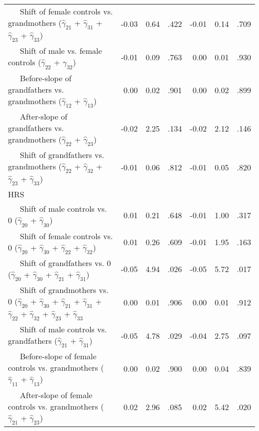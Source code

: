 \documentclass[
  english,
  man, noextraspace]{apa7}
\newenvironment{lltable}{\begin{landscape}\begin{center}\begin{ThreePartTable}}{\end{ThreePartTable}\end{center}\end{landscape}}
\begin{document}
\begin{appendix}
\begin{lltable}
{\begin{longtable}{lrrrrrr}
\ \ \ Shift of female controls vs. grandmothers 
($\hat{\gamma}_{21}$ + $\hat{\gamma}_{31}$ + 
$\hat{\gamma}_{23}$ + $\hat{\gamma}_{33}$) \textcolor{white}{L} & -0.03 & 0.64 & .422 & -0.01 & 0.14 & .709\\
\ \ \ Shift of male vs. female controls 
($\hat{\gamma}_{22}$ + $\hat{\gamma}_{32}$) \textcolor{white}{L} & -0.01 & 0.09 & .763 & 0.00 & 0.01 & .930\\
\ \ \ Before-slope of grandfathers vs. grandmothers 
($\hat{\gamma}_{12}$ + $\hat{\gamma}_{13}$) \textcolor{white}{L} & 0.00 & 0.02 & .901 & 0.00 & 0.02 & .899\\
\ \ \ After-slope of grandfathers vs. grandmothers 
($\hat{\gamma}_{22}$ + $\hat{\gamma}_{23}$) \textcolor{white}{L} & -0.02 & 2.25 & .134 & -0.02 & 2.12 & .146\\
\ \ \ Shift of grandfathers vs. grandmothers 
($\hat{\gamma}_{22}$ + $\hat{\gamma}_{32}$ + 
$\hat{\gamma}_{23}$ + $\hat{\gamma}_{33}$) \textcolor{white}{L} & -0.01 & 0.06 & .812 & -0.01 & 0.05 & .820\\
HRS &  &  &  &  &  & \\
\ \ \ Shift of male controls vs. 0 ($\hat{\gamma}_{20}$ + 
$\hat{\gamma}_{30}$) \textcolor{white}{H} & 0.01 & 0.21 & .648 & -0.01 & 1.00 & .317\\
\ \ \ Shift of female controls vs. 0 ($\hat{\gamma}_{20}$ + 
$\hat{\gamma}_{30}$ + $\hat{\gamma}_{22}$ + 
$\hat{\gamma}_{32}$) \textcolor{white}{H} & 0.01 & 0.26 & .609 & -0.01 & 1.95 & .163\\
\ \ \ Shift of grandfathers vs. 0 ($\hat{\gamma}_{20}$ + 
$\hat{\gamma}_{30}$ + $\hat{\gamma}_{21}$ + 
$\hat{\gamma}_{31}$) \textcolor{white}{H} & -0.05 & 4.94 & .026 & -0.05 & 5.72 & .017\\
\ \ \ Shift of grandmothers vs. 0 ($\hat{\gamma}_{20}$ + 
$\hat{\gamma}_{30}$ + $\hat{\gamma}_{21}$ + 
$\hat{\gamma}_{31}$ + $\hat{\gamma}_{22}$ + 
$\hat{\gamma}_{32}$ + $\hat{\gamma}_{23}$ +
$\hat{\gamma}_{33}$ \textcolor{white}{H} & 0.00 & 0.01 & .906 & 0.00 & 0.01 & .912\\
\ \ \ Shift of male controls vs. grandfathers 
($\hat{\gamma}_{21}$ + $\hat{\gamma}_{31}$) \textcolor{white}{H} & -0.05 & 4.78 & .029 & -0.04 & 2.75 & .097\\
\ \ \ Before-slope of female controls vs. grandmothers 
($\hat{\gamma}_{11}$ + $\hat{\gamma}_{13}$) \textcolor{white}{H} & 0.00 & 0.02 & .900 & 0.00 & 0.04 & .839\\
\ \ \ After-slope of female controls vs. grandmothers 
($\hat{\gamma}_{21}$ + $\hat{\gamma}_{23}$) \textcolor{white}{H} & 0.02 & 2.96 & .085 & 0.02 & 5.42 & .020\\

\end{longtable}}
\end{lltable}
\end{appendix}
\end{document}
